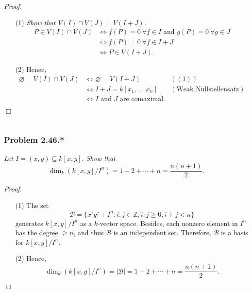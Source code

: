 \documentclass{article}
\begin{document}
\emph{Proof.}
\begin{enumerate}
\item[(1)]
  \emph{Show that $V(I) \cap V(J) = V(I + J)$.}
  \begin{align*}
    P \in V(I) \cap V(J)
    &\Longleftrightarrow
    f(P) = 0 \: \forall f \in I \text{ and } g(P) = 0 \: \forall g \in J \\
    &\Longleftrightarrow
    f(P) = 0 \: \forall f \in I + J \\
    &\Longleftrightarrow
    P \in V(I + J).
  \end{align*}

\item[(2)]
  Hence,
  \begin{align*}
    \varnothing = V(I) \cap V(J)
    &\Longleftrightarrow
    \varnothing = V(I + J)
      &((1)) \\
    &\Longleftrightarrow
    I + J = k[x_1,\ldots,x_n]
      &(\text{Weak Nullstellensatz}) \\
    &\Longleftrightarrow
    \text{$I$ and $J$ are comaximal}.
  \end{align*}
\end{enumerate}
$\Box$ \\\\






\subsubsection*{Problem 2.46.*}
\emph{Let $I = (x,y) \subseteq k[x,y]$.
Show that}
\[
  \dim_{k}(k[x,y]/I^n) = 1 + 2 + \cdots + n = \frac{n(n+1)}{2}.
\]

\emph{Proof.}
\begin{enumerate}
\item[(1)]
  The set
  \[
    \mathscr{B} = \{ x^i y^j + I^n : i, j \in \mathbb{Z}, i, j \geq 0, i + j < n \}
  \]
  generates $k[x,y]/I^n$ as a $k$-vector space.
  Besides, each nonzero element in $I^n$ has the degree $\geq n$,
  and thus $\mathscr{B}$ is an independent set.
  Therefore, $\mathscr{B}$ is a basis for $k[x,y]/I^n$.

\item[(2)]
  Hence,
  \[
    \dim_{k}(k[x,y]/I^n)
    = |\mathscr{B}|
    = 1 + 2 + \cdots + n
    = \frac{n(n+1)}{2}.
  \]
\end{enumerate}
$\Box$ \\\\
\end{document}
